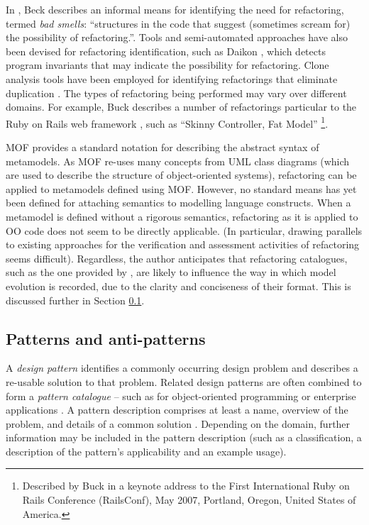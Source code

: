 In \cite{fowler99refactoring}, Beck describes an informal means for identifying the need for refactoring, termed \textit{bad smells}: ``structures in the code that suggest (sometimes scream for) the possibility of refactoring.''. Tools and semi-automated approaches have also been devised for refactoring identification, such as Daikon \cite{kataoka01automated}, which detects program invariants that may indicate the possibility for refactoring. Clone analysis tools have been employed for identifying refactorings that eliminate duplication \cite{balazinska00advanced,ducasse99language}. The types of refactoring being performed may vary over different domains. For example, Buck describes a number of refactorings particular to the Ruby on Rails web framework \cite{ror}, such as ``Skinny Controller, Fat Model'' \footnote{Described by Buck in a keynote address to the First International Ruby on Rails Conference (RailsConf), May 2007, Portland, Oregon, United States of America.}.

MOF \cite{mof} provides a standard notation for describing the abstract syntax of metamodels. As MOF re-uses many concepts from UML class diagrams (which are used to describe the structure of object-oriented systems), refactoring can be applied to metamodels defined using MOF. However, no standard means has yet been defined for attaching semantics to modelling language constructs. When a metamodel is defined without a rigorous semantics, refactoring as it is applied to OO code does not seem to be directly applicable. (In particular, drawing parallels to existing approaches for the verification and assessment activities of refactoring seems difficult). Regardless, the author anticipates that refactoring catalogues, such as the one provided by \cite{fowler99refactoring}, are likely to influence the way in which model evolution is recorded, due to the clarity and conciseness of their format. This is discussed further in Section \ref{sec:LitReviewPatterns}.


\subsection{Patterns and anti-patterns}
\label{sec:LitReviewPatterns}
A \textit{design pattern} identifies a commonly occurring design problem and describes a re-usable solution to that problem. Related design patterns are often combined to form a \textit{pattern catalogue} -- such as for object-oriented programming \cite{gamma95patterns} or enterprise applications \cite{fowler02patterns}. A pattern description comprises at least a name, overview of the problem, and details of a common solution \cite{brown98antipatterns}. Depending on the domain, further information may be included in the pattern description (such as a classification, a description of the pattern's applicability and an example usage).

